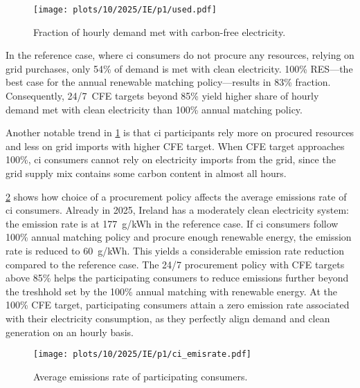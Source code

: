 \begin{figure}
    \centering
    \texttt{[image: plots/10/2025/IE/p1/used.pdf]}
    \caption{Fraction of hourly demand met with carbon-free electricity.}
    \label{fig:10-2025-IE-p1-used}
\end{figure}

In the reference case, where \gls{ci} consumers do not procure any resources, relying on grid purchases, only 54\% of demand is met with clean electricity.
100\% RES---the best case for the annual renewable matching policy---results in 83\% fraction. 
Consequently, 24/7~CFE targets beyond 85\% yield higher share of hourly demand met with clean electricity than 100\% annual matching policy.

Another notable trend in \cref{fig:10-2025-IE-p1-used} is that \gls{ci} participants rely more on procured resources and less on grid imports with higher CFE target.
When CFE target approaches 100\%, \gls{ci} consumers cannot rely on electricity imports from the grid, since the grid supply mix contains some carbon content in almost all hours.

\cref{fig:10-2025-IE-p1-ci_emisrate} shows how choice of a procurement policy affects the average emissions rate of \gls{ci} consumers.
Already in 2025, Ireland has a moderately clean electricity system: the emission rate is at 177~g\co/kWh in the reference case. 
If \gls{ci} consumers follow 100\% annual matching policy and procure enough renewable energy, the emission rate is reduced to 60~g\co/kWh.
This yields a considerable emission rate reduction compared to the reference case.
The 24/7 procurement policy with CFE targets above 85\% helps the participating consumers to reduce emissions further beyond the treshhold set by the 100\% annual matching with renewable energy. 
At the 100\% CFE target, participating consumers attain a zero emission rate associated with their electricity consumption, as they perfectly align demand and clean generation on an hourly basis.

\begin{figure}
    \centering
    \texttt{[image: plots/10/2025/IE/p1/ci\_emisrate.pdf]}
    \caption{Average emissions rate of participating consumers.}
    \label{fig:10-2025-IE-p1-ci_emisrate}
\end{figure}

